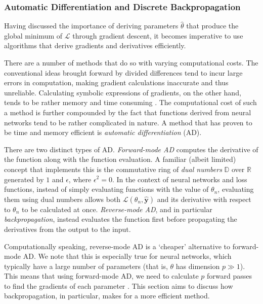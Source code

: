 \documentclass[a4paper,11pt,titlepage]{article}
\theoremstyle{definition}
\theoremstyle{plain}
\theoremstyle{remark}
\begin{document}
\subsubsection{Automatic Differentiation and Discrete Backpropagation}
\label{sec:ad}

Having discussed the importance of deriving parameters $\hat{\theta}$ that produce the global minimum of $\mathcal{L}$ through gradient descent, it becomes imperative to use algorithms that derive gradients and derivatives efficiently.

There are a number of methods that do so with varying computational costs. The conventional ideas brought forward by divided differences tend to incur large errors in computation, making gradient calculations inaccurate and thus unreliable. Calculating symbolic expressions of gradients, on the other hand, tends to be rather memory and time consuming \cite{tucker2011}. The computational cost of such a method is further compounded by the fact that functions derived from neural networks tend to be rather complicated in nature. A method that has proven to be time and memory efficient is \textit{automatic differentiation} (AD).

There are two distinct types of AD. \textit{Forward-mode AD} computes the derivative of the function along with the function evaluation. A familiar (albeit limited) concept that implements this is the commutative ring of \textit{dual numbers} $\mathbb{D}$ over $\mathbb{R}$ generated by $1$ and $\epsilon$, where $\epsilon^2 = 0$. In the context of neural networks and loss functions, instead of simply evaluating functions with the value of $\theta_n$, evaluating them using dual numbers allows both $\mathcal{L}(\theta_n, \mathbf{\hat{y}})$ and its derivative with respect to $\theta_n$ to be calculated at once. \textit{Reverse-mode AD}, and in particular \textit{backpropagation}, instead evaluates the function first before propagating the derivatives from the output to the input. 

Computationally speaking, reverse-mode AD is a ‘cheaper’ alternative to forward-mode AD. We note that this is especially true for neural networks, which typically have a large number of parameters (that is, $\theta$ has dimension $p \gg 1$). This means that using forward-mode AD, we need to calculate $p$ forward passes to find the gradients of each parameter \cite{griewank2008}. This section aims to discuss how backpropagation, in particular, makes for a more efficient method.
\end{document}
